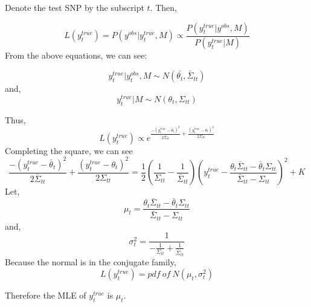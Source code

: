 \documentclass[10pt,a4paper,draft]{article}
\begin{document}
Denote the test SNP by the subscript $t$. Then,

\begin{equation}
L(y_t^{true}) = P(y^{obs} | y_t^{true}, M) \propto \frac{P(y_t^{true}| y^{obs}, M)}{P(y_t^{true} | M)}
\end{equation}
From the above equations, we can see:

\begin{equation}
y_t^{true} | y_t^{obs}, M \sim N(\bar{\theta_t}, \bar{\Sigma}_{tt})
\end{equation}
and,
\begin{equation}
y_t^{true} | M \sim N(\theta_t, \Sigma_{tt})
\end{equation}

Thus,
\begin{equation}
L(y_t^{true}) \propto e^{ \frac{-(y_t^{true} - \bar{\theta}_t)^2}{2\bar{\Sigma}_{tt}} + \frac{(y_t^{true} - \theta_t)^2}{2\Sigma_{tt}} }
\end{equation}
Completing the square, we can see
\begin{equation}
\frac{-(y_t^{true} - \bar{\theta}_t)^2}{2\bar{\Sigma}_{tt}} + \frac{(y_t^{true} - \theta_t)^2}{2\Sigma_{tt}} = \frac{1}{2}(\frac{1}{\Sigma_{tt}} - \frac{1}{\bar{\Sigma}_{tt}}) (y_t^{true} - \frac{\theta_t\bar{\Sigma}_{tt} - \bar{\theta}_t\Sigma_{tt}}{\bar{\Sigma}_{tt}-\Sigma_{tt}})^2 + K
\end{equation}
Let,
\begin{equation}
\mu_t = \frac{\theta_t\bar{\Sigma}_{tt} - \bar{\theta}_t\Sigma_{tt}}{\bar{\Sigma}_{tt}-\Sigma_{tt}}
\end{equation}
and,
\begin{equation}
\sigma^2_t = \frac{1}{-\frac{1}{\Sigma_{tt}} +\frac{1}{\bar{\Sigma}_{tt}}}
\end{equation}
Because the normal is in the conjugate family,
\begin{equation}
L(y_t^{true}) = pdf \ of \ N(\mu_t, \sigma^2_t)
\end{equation}

Therefore the MLE of $y_t^{true}$ is $\mu_t$.

\end{document}
